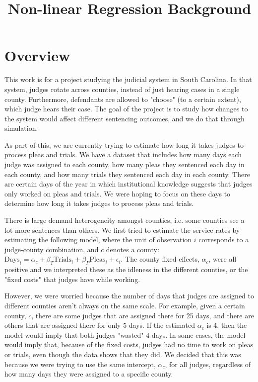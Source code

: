 \documentclass[11pt]{article}
\title{Non-linear Regression Background}
\begin{document}
\maketitle

\section{Overview}
  This work is for a project studying the judicial system in South Carolina. In that system, judges rotate across counties, instead of just hearing cases in a single county. Furthermore, defendants are allowed to "choose" (to a certain extent), which judge hears their case. The goal of the project is to study how changes to the system would affect different sentencing outcomes, and we do that through simulation.

  As part of this, we are currently trying to estimate how long it takes judges to process pleas and trials. We have a dataset that includes how many days each judge was assigned to each county, how many pleas they sentenced each day in each county, and how many trials they sentenced each day in each county. There are certain days of the year in which institutional knowledge suggests that judges only worked on pleas and trials. We were hoping to focus on these days to determine how long it takes judges to process pleas and trials.

  There is large demand heterogeneity amongst counties, i.e. some counties see a lot more sentences than others. We first tried to estimate the service rates by estimating the following model, where the unit of observation $i$ corresponds to a judge-county combination, and $c$ denotes a county: $\text{Days}_i = \alpha_c + \beta_T \text{Trials}_i + \beta_P \text{Pleas}_i + \epsilon_i$. The county fixed effects, $\alpha_c$, were all positive and we interpreted these as the idleness in the different counties, or the "fixed costs" that judges have while working.

  However, we were worried because the number of days that judges are assigned to different counties aren't always on the same scale. For example, given a certain county, $c$, there are some judges that are assigned there for 25 days, and there are others that are assigned there for only 5 days. If the estimated $\alpha_c$ is 4, then the model would imply that both judges "wasted" 4 days. In some cases, the model would imply that, because of the fixed costs, judges had no time to work on pleas or trials, even though the data shows that they did. We decided that this was because we were trying to use the same intercept, $\alpha_c$, for all judges, regardless of how many days they were assigned to a specific county.
\end{document}
